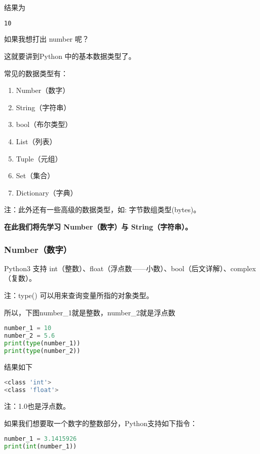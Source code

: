 结果为

\begin{lstlisting}[language=bash]
10
\end{lstlisting}

如果我想打出 number 呢？

这就要讲到Python 中的基本数据类型了。

常见的数据类型有：

\begin{enumerate}
\item Number（数字）
\item String（字符串）
\item bool（布尔类型）
\item List（列表）
\item Tuple（元组）
\item Set（集合）
\item Dictionary（字典）
\end{enumerate}

注：此外还有一些高级的数据类型，如: 字节数组类型(bytes)。

\textbf{在此我们将先学习 Number（数字）与 String（字符串）。}

\subsubsection{Number（数字）}

Python3 支持 int（整数）、float（浮点数——小数）、bool（后文详解）、complex（复数）。

注：type() 可以用来查询变量所指的对象类型。

所以，下图number_1就是整数，number_2就是浮点数

\begin{lstlisting}[language=python]
number_1 = 10 
number_2 = 5.6
print(type(number_1))
print(type(number_2))
\end{lstlisting}

结果如下

\begin{lstlisting}[language=bash]
<class 'int'>
<class 'float'>
\end{lstlisting}

注：1.0也是浮点数。

如果我们想要取一个数字的整数部分，Python支持如下指令：

\begin{lstlisting}[language=python]
number_1 = 3.1415926
print(int(number_1))
\end{lstlisting}

